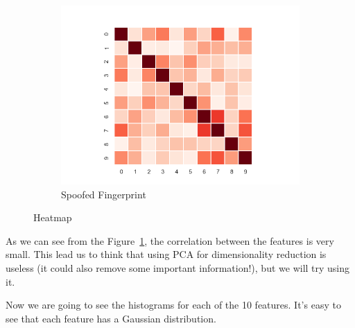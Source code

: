 \documentclass[english]{report}
\begin{document}
\begin{figure}[h!]
\begin{subfigure}{0.3\textwidth}
    \end{subfigure}
    \begin{subfigure}{0.3\textwidth}
        \includegraphics[scale=0.3]{../../images/feature_plot/heatmap_spoofedFingerprint_}
        \caption{Spoofed Fingerprint}

    \end{subfigure}
    \centering
    \caption{Heatmap}
    \label{fig:HeatMap}
\end{figure}

As we can see from the Figure~\ref{fig:HeatMap}, the correlation between the features is very small.
This lead us to think that using PCA for dimensionality reduction is useless (it could
also remove some important information!), but we will try using it. \newline

Now we are going to see the histograms for each of the 10 features.
It's easy to see that each feature has a Gaussian distribution. \newline
\end{document}
